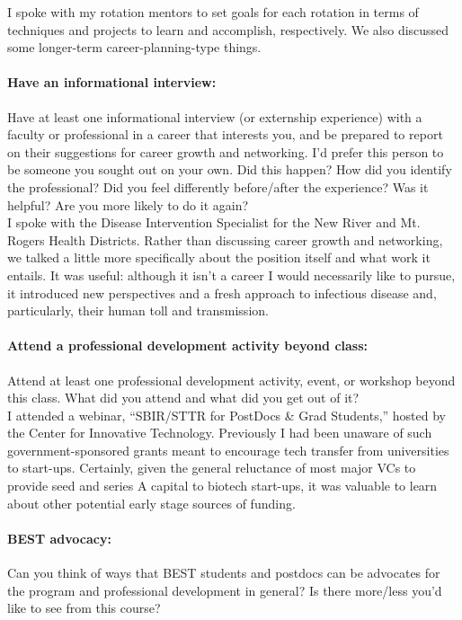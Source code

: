 \documentclass[11pt,letterpaper,final] {article}
\begin{document}
	I spoke with my rotation mentors to set goals for each rotation in terms of techniques and projects to learn and accomplish, respectively. We also discussed some longer-term career-planning-type things.
	
	\paragraph{Have an informational interview:} Have at least one informational interview (or externship experience) with a faculty or professional in a career that interests you, and be prepared to report on their suggestions for career growth and networking. I’d prefer this person to be someone you sought out on your own. Did this happen? How did you identify the professional? Did you feel differently before/after the experience? Was it helpful? Are you more likely to do it again?\\
	
	I spoke with the Disease Intervention Specialist for the New River and Mt. Rogers Health Districts. Rather than discussing career growth and networking, we talked a little more specifically about the position itself and what work it entails. It was useful: although it isn't a career I would necessarily like to pursue, it introduced new perspectives and a fresh approach to infectious disease and, particularly, their human toll and transmission.
	
	\paragraph{Attend a professional development activity beyond class:} Attend at least one professional development activity, event, or workshop beyond this class. What did you attend and what did you get out of it?\\
	
	I attended a webinar, ``SBIR/STTR for PostDocs \& Grad Students,'' hosted by the Center for Innovative Technology. Previously I had been unaware of such government-sponsored grants meant to encourage tech transfer from universities to start-ups. Certainly, given the general reluctance of most major VCs to provide seed and series A capital to biotech start-ups, it was valuable to learn about other potential early stage sources of funding.
	
	\paragraph{BEST advocacy:} Can you think of ways that BEST students and postdocs can be advocates for the program and professional development in general? Is there more/less you'd like to see from this course?\\
	
\end{document}
